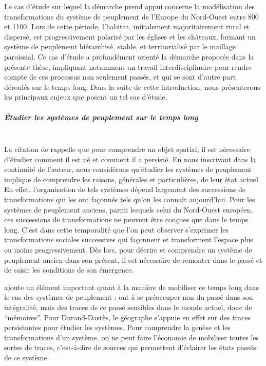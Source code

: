 Le cas d'étude sur lequel la démarche prend appui concerne la modélisation des transformations du système de peuplement de l'Europe du Nord-Ouest entre 800 et 1100.
Lors de cette période, l'habitat, initialement majoritairement rural et dispersé, est progressivement polarisé par les églises et les châteaux, formant un système de peuplement hiérarchisé, stable, et territorialisé par le maillage paroissial.
Ce cas d'étude a profondément orienté la démarche proposée dans la présente thèse, impliquant notamment un travail interdisciplinaire pour rendre compte de ces processus non seulement passés, et qui se sont d'autre part déroulés sur le temps long.
Dans la suite de cette introduction, nous présenterons les principaux enjeux que posent un tel cas d'étude.


\subparagraph{Étudier les systèmes de peuplement sur le temps long}\mbox{}\\
La citation de \textcite{durand-dastes_jamais_1999} rappelle que pour comprendre un \og objet spatial\fg{}, il est nécessaire d'étudier \og comment il est né et comment il a persisté\fg{}.
En nous inscrivant dans la continuité de l'auteur, nous considérons qu'étudier les systèmes de peuplement implique de comprendre les raisons, générales et particulières, de leur état actuel.
En effet, l'organisation de tels systèmes dépend largement des successions de transformations qui les ont façonnés tels qu'on les connaît aujourd'hui.
Pour les systèmes de peuplement anciens, parmi lesquels celui du Nord-Ouest européen, ces successions de transformations ne peuvent être conçues que dans le temps long.
C'est dans cette temporalité que l'on peut observer s'exprimer les transformations sociales successives qui façonnent et transforment l'espace plus ou moins progressivement.
Dès lors, pour décrire et comprendre un système de peuplement ancien dans son présent, il est nécessaire de remonter dans le passé et de saisir les conditions de son émergence.

\textcite{durand-dastes_jamais_1999} ajoute un élément important quant à la manière de mobiliser ce temps long dans le cas des systèmes de peuplement : 	 ont à se préoccuper non du passé dans son intégralité, mais des traces de ce passé sensibles dans le monde actuel, donc de “mémoires”\fg{}.
Pour Durand-Dastès, le géographe s'appuie en effet sur des \og traces\fg{} persistantes pour étudier les systèmes.
Pour comprendre la genèse et les transformations d'un système, on ne peut faire l'économie de mobiliser toutes les sortes de traces, c'est-à-dire de sources qui permettent d'éclairer les états passés de ce système.


